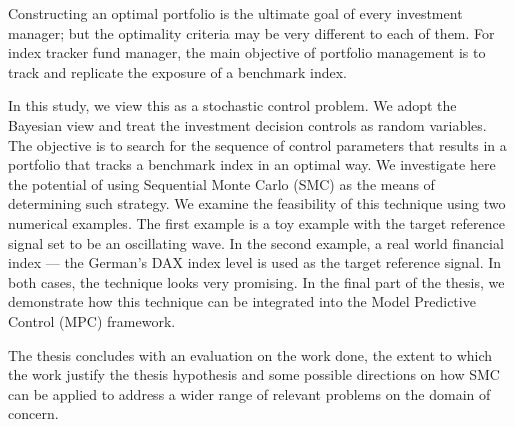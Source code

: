 


\begin{abstracts}        %
  Constructing an optimal portfolio is the ultimate goal of every investment manager; but the optimality criteria may be very different to each of them. For index tracker fund manager, the main objective of portfolio management is to track and replicate the exposure of a benchmark index.

In this study, we view this as a stochastic control problem. We adopt the Bayesian view and treat the investment decision controls as random variables. The objective is to search for the sequence of control parameters that results in a portfolio that tracks a benchmark index in an optimal way. We investigate here the potential of using Sequential Monte Carlo (SMC) as the means of determining such strategy. We examine the feasibility of this technique using two numerical examples. The first example is a toy example with the target reference signal set to be an oscillating wave. In the second example, a real world financial index --- the German's DAX index level is used as the target reference signal. In both cases, the technique looks very promising. In the final part of the thesis, we demonstrate how this technique can be integrated into the Model Predictive Control (MPC) framework.

  The thesis concludes with an evaluation on the work done, the extent
  to which the work justify the thesis hypothesis and some possible
  directions on how SMC can be applied to address
  a wider range of relevant problems on the domain of concern.
\end{abstracts}




